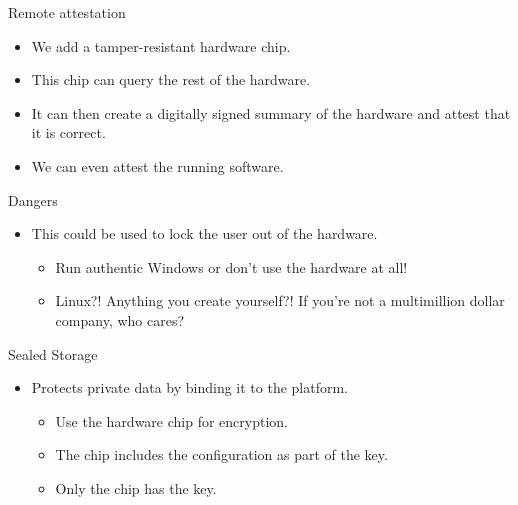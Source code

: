 \begin{frame}
  \begin{block}{Remote attestation}
    \begin{itemize}
      \item We add a tamper-resistant hardware chip.
      \item This chip can query the rest of the hardware.
      \item It can then create a digitally signed summary of the hardware and 
        attest that it is correct.

        \pause{}

      \item We can even attest the running software.
    \end{itemize}
  \end{block}
\end{frame}

\begin{frame}
  \begin{alertblock}{Dangers}
    \begin{itemize}
      \item This could be used to lock the user out of the hardware.
        \begin{itemize}
          \item Run authentic Windows or don't use the hardware at all!
          \item Linux?!
            Anything you create yourself?!
            If you're not a multimillion dollar company, who cares?
        \end{itemize}
    \end{itemize}
  \end{alertblock}
\end{frame}

\begin{frame}
  \begin{block}{Sealed Storage}
    \begin{itemize}
      \item Protects private data by binding it to the platform.
        \begin{itemize}
          \item Use the hardware chip for encryption.
          \item The chip includes the configuration as part of the key.
          \item Only the chip has the key.
        \end{itemize}
    \end{itemize}
  \end{block}
\end{frame}


